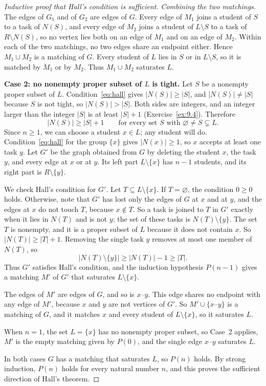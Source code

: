 \begin{proof}[Inductive proof that Hall's condition is sufficient]
\emph{Combining the two matchings.} The edges of $G_1$ and of $G_2$ are edges of $G$. Every edge of $M_1$ joins a student of $S$ to a task of $N(S)$, and every edge of $M_2$ joins a student of $L\setminus S$ to a task of $R\setminus N(S)$, so no vertex lies both on an edge of $M_1$ and on an edge of $M_2$. Within each of the two matchings, no two edges share an endpoint either. Hence $M_1\cup M_2$ is a matching of $G$. Every student of $L$ lies in $S$ or in $L\setminus S$, so it is matched by $M_1$ or by $M_2$. Thus $M_1\cup M_2$ saturates $L$.

\textbf{Case 2: no nonempty proper subset of $L$ is tight.} Let $S$ be a nonempty proper subset of $L$. Condition~\eqref{eq:hall} gives $|N(S)|\ge|S|$, and $|N(S)|\ne|S|$ because $S$ is not tight, so $|N(S)|>|S|$. Both sides are integers, and an integer larger than the integer $|S|$ is at least $|S|+1$ (Exercise~\ref{ex:9.4}). Therefore
\[
|N(S)|\ge |S|+1\qquad\text{for every set $S$ with }\varnothing\ne S\subsetneq L.
\]
Since $n\ge1$, we can choose a student $x\in L$; any student will do. Condition~\eqref{eq:hall} for the group $\{x\}$ gives $|N(x)|\ge1$, so $x$ accepts at least one task $y$. Let $G'$ be the graph obtained from $G$ by deleting the student $x$, the task $y$, and every edge at $x$ or at $y$. Its left part $L\setminus\{x\}$ has $n-1$ students, and its right part is $R\setminus\{y\}$.

We check Hall's condition for $G'$. Let $T\subseteq L\setminus\{x\}$. If $T=\varnothing$, the condition $0\ge0$ holds. Otherwise, note that $G'$ has lost only the edges of $G$ at $x$ and at $y$, and the edges at $x$ do not touch $T$, because $x\notin T$. So a task is joined to $T$ in $G'$ exactly when it lies in $N(T)$ and is not $y$; the set of these tasks is $N(T)\setminus\{y\}$. The set $T$ is nonempty, and it is a proper subset of $L$ because it does not contain $x$. So $|N(T)|\ge|T|+1$. Removing the single task $y$ removes at most one member of $N(T)$, so
\[
|N(T)\setminus\{y\}|\ge |N(T)|-1\ge |T|.
\]
Thus $G'$ satisfies Hall's condition, and the induction hypothesis $P(n-1)$ gives a matching $M'$ of $G'$ that saturates $L\setminus\{x\}$.

The edges of $M'$ are edges of $G$, and so is $x$--$y$. This edge shares no endpoint with any edge of $M'$, because $x$ and $y$ are not vertices of $G'$. So $M'\cup\{x\text{--}y\}$ is a matching of $G$, and it matches $x$ and every student of $L\setminus\{x\}$, so it saturates $L$.

When $n=1$, the set $L=\{x\}$ has no nonempty proper subset, so Case~2 applies, $M'$ is the empty matching given by $P(0)$, and the single edge $x$--$y$ saturates $L$.

In both cases $G$ has a matching that saturates $L$, so $P(n)$ holds. By strong induction, $P(n)$ holds for every natural number $n$, and this proves the sufficient direction of Hall's theorem.
\end{proof}
